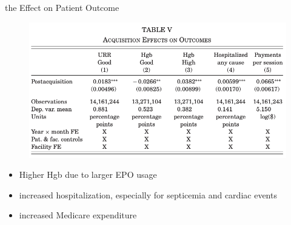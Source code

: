 \begin{frame}{the Effect on Patient Outcome}
    \begin{figure}
        \centering
        \includegraphics[width=0.8\linewidth]{tb5.png}
    \end{figure}
    \begin{itemize}
        \item Higher Hgb due to larger EPO usage
        \item increased hospitalization, especially for septicemia and cardiac events
        \item increased Medicare expenditure
    \end{itemize}
\end{frame}